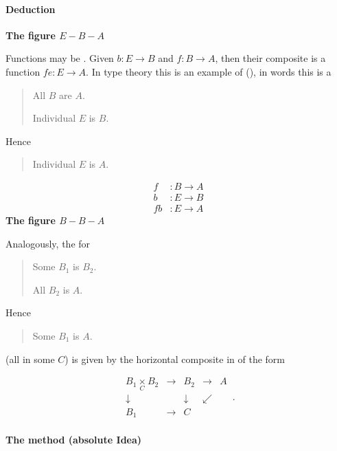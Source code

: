 \documentclass[12pt,titlepage]{article}
\newcommand{\itexarray}[1]{\begin{matrix}#1\end{matrix}}
\theoremstyle{plain}
\theoremstyle{definition}
\theoremstyle{remark}
\begin{document}
\hypertarget{deduction}{}\paragraph*{{Deduction}}\label{deduction}

\textbf{The figure $E-B-A$}

Functions may be . Given $b \colon E \to B$ and $f \colon B \to A$, then their composite is a function $f e \colon E \to A$. In type theory this is an example of  (), in words this is a 

\begin{quote}%
All $B$ are $A$.

Individual $E$ is $B$.


\end{quote}
Hence

\begin{quote}%
Individual $E$ is $A$.


\end{quote}
\begin{displaymath}
\begin{aligned}
    f & \colon B \longrightarrow A
    \\
    b & \colon E \longrightarrow B
    \\
    f b & \colon E \longrightarrow A
  \end{aligned}
\end{displaymath}
\textbf{The figure $B-B-A$}

Analogously, the  for

\begin{quote}%
Some $B_1$ is $B_2$.

All $B_2$ is $A$.


\end{quote}
Hence

\begin{quote}%
Some $B_1$ is $A$.


\end{quote}
(all in some  $C$) is given by the horizontal composite in  of the form

\begin{displaymath}
\itexarray{
     B_1 \underset{C}{\times} B_2 &\longrightarrow& B_2 &\longrightarrow& A
     \\
     \downarrow && \downarrow & \swarrow
     \\
     B_1 &\longrightarrow& C
  }
  \,.
\end{displaymath}
\hypertarget{the_method_absolute_idea}{}\paragraph*{{The method (absolute Idea)}}\label{the_method_absolute_idea}
\end{document}
